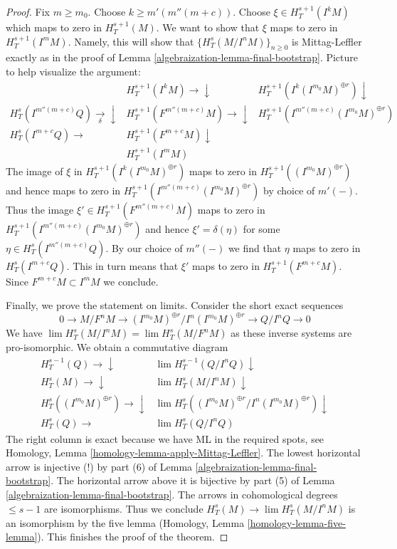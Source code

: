 \begin{proof}
\medskip\noindent
Fix $m \geq m_0$. Choose $k \geq m'(m''(m + c))$.
Choose $\xi \in H^{s + 1}_T(I^kM)$
which maps to zero in $H^{s + 1}_T(M)$.
We want to show that $\xi$ maps to zero in $H^{s + 1}_T(I^mM)$.
Namely, this will show that $\{H^s_T(M/I^nM)\}_{n \geq 0}$
is Mittag-Leffler exactly as in the proof of Lemma \ref{algebraization-lemma-final-bootstrap}.
Picture to help visualize the argument:
$$
\begin{array}{cccc} & H^{s + 1}_T(I^kM) \longrightarrow\downarrow & H^{s + 1}_T(I^k(I^{m_0}M)^{\oplus r}) \downarrow &  \\ H^s_T(I^{m''(m + c)}Q) \underset{\delta}{\longrightarrow}\downarrow & H^{s + 1}_T(F^{m''(m + c)}M) \longrightarrow\downarrow & H^{s + 1}_T(I^{m''(m + c)}(I^{m_0}M)^{\oplus r}) &  \\ H^s_T(I^{m + c}Q) \longrightarrow & H^{s + 1}_T(F^{m + c}M) \downarrow &  &  \\  & H^{s + 1}_T(I^mM) &  & \end{array}
$$
The image of $\xi$ in $H^{s + 1}_T(I^k(I^{m_0}M)^{\oplus r})$
maps to zero in $H^{s + 1}_T((I^{m_0}M)^{\oplus r})$
and hence maps to zero in
$H^{s + 1}_T(I^{m''(m + c)}(I^{m_0}M)^{\oplus r})$
by choice of $m'(-)$.
Thus the image $\xi' \in H^{s + 1}_T(F^{m''(m + c)}M)$
maps to zero in $H^{s + 1}_T(I^{m''(m + c)}(I^{m_0}M)^{\oplus r})$
and hence $\xi' = \delta(\eta)$ for some
$\eta \in H^s_T(I^{m''(m + c)}Q)$.
By our choice of $m''(-)$ we find that $\eta$ maps to
zero in $H^s_T(I^{m + c}Q)$.
This in turn means that $\xi'$ maps to zero in
$H^{s + 1}_T(F^{m + c}M)$.
Since $F^{m + c}M \subset I^mM$ we conclude.

\medskip\noindent
Finally, we prove the statement on limits. Consider the short
exact sequences
$$
0 \to M/F^nM \to (I^{m_0}M)^{\oplus r}/I^n (I^{m_0}M)^{\oplus r}
\to Q/I^nQ \to 0
$$
We have $\lim H^s_T(M/I^nM) = \lim H^s_T(M/F^nM)$
as these inverse systems are pro-isomorphic. We obtain a commutative diagram
$$
\begin{array}{cc}H^{s - 1}_T(Q) \longrightarrow\downarrow & \lim H^{s - 1}_T(Q/I^nQ) \downarrow \\ H^s_T(M) \longrightarrow\downarrow & \lim H^s_T(M/I^nM) \downarrow \\ H^s_T((I^{m_0}M)^{\oplus r}) \longrightarrow\downarrow & \lim H^s_T((I^{m_0}M)^{\oplus r}/I^n(I^{m_0}M)^{\oplus r}) \downarrow \\ H^s_T(Q) \longrightarrow & \lim H^s_T(Q/I^nQ)\end{array}
$$
The right column is exact because we have ML in the required spots, see
Homology, Lemma \ref{homology-lemma-apply-Mittag-Leffler}.
The lowest horizontal arrow is injective (!) by
part (6) of Lemma \ref{algebraization-lemma-final-bootstrap}.
The horizontal arrow above it is bijective by
part (5) of Lemma \ref{algebraization-lemma-final-bootstrap}.
The arrows in cohomological degrees $\leq s - 1$ are isomorphisms.
Thus we conclude $H^s_T(M) \to \lim H^s_T(M/I^nM)$
is an isomorphism by the five lemma
(Homology, Lemma \ref{homology-lemma-five-lemma}).
This finishes the proof of the theorem.
\end{proof}

